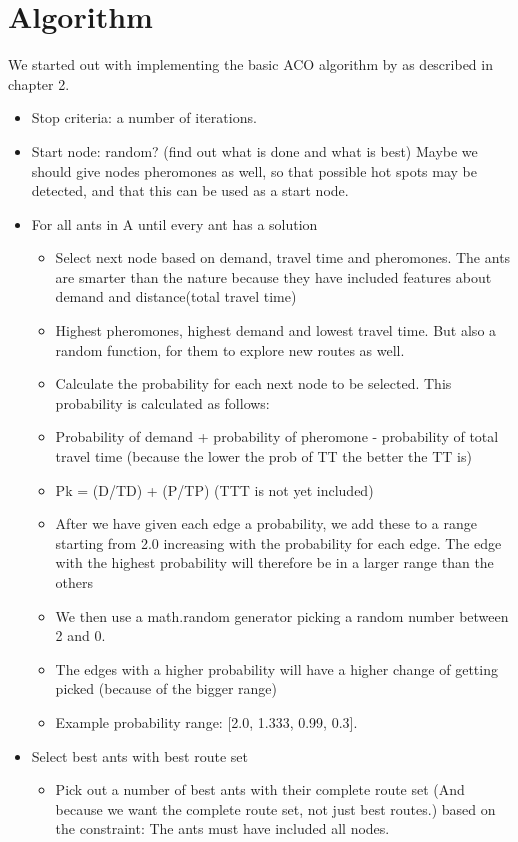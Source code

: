 \section{Algorithm}

We started out with implementing the basic ACO algorithm by \citet{nanda11} as described in chapter 2.

\begin{itemize}
\item Stop criteria: a number of iterations. 
\item Start node: random? (find out what is done and what is best) Maybe we should give nodes pheromones as well, so that possible hot spots may be detected, and that this can be used as a start node. 
\item For all ants in A until every ant has a solution
\begin{itemize}
\item Select next node based on demand, travel time and pheromones. The ants are smarter than the nature because they have included features about demand and distance(total travel time)
\item Highest pheromones, highest demand and lowest travel time. But also a random function, for them to explore new routes as well.
\item Calculate the probability for each next node to be selected. This probability is calculated as follows:
\item Probability of demand + probability of pheromone - probability of total travel time (because the lower the prob of TT the better the TT is)
\item Pk = (D/TD) + (P/TP) (TTT is not yet included)
\item After we have given each edge a probability, we add these to a range starting from 2.0 increasing with the probability for each edge. The edge with the highest probability will therefore be in a larger range than the others
\item We then use a math.random generator picking a random number between 2 and 0. 
\item The edges with a higher probability will have a higher change of getting picked (because of the bigger range)
\item Example probability range: [2.0, 1.333, 0.99, 0.3]. 
\end{itemize}
\item Select best ants with best route set
\begin{itemize}
\item Pick out a number of best ants with their complete route set (And because we want the complete route set, not just best routes.) based on the constraint: The ants must have included all nodes. 

\end{itemize}
\end{itemize}
